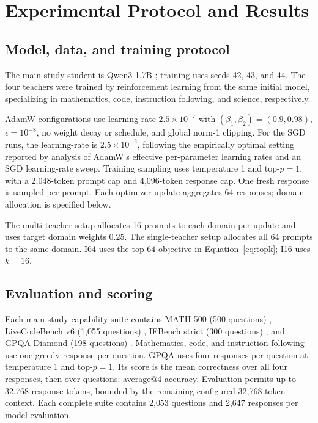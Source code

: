 \section{Experimental Protocol and Results}
\label{app:setup}

\subsection{Model, data, and training protocol}

The main-study student is Qwen3-1.7B \citep{qwen2025qwen3}; training uses seeds 42, 43, and 44. The four teachers were trained by reinforcement learning from the same initial model, specializing in mathematics, code, instruction following, and science, respectively.

AdamW configurations use learning rate $2.5\times10^{-7}$ with $(\beta_1,\beta_2)=(0.9,0.98)$, $\epsilon=10^{-8}$, no weight decay or schedule, and global norm-1 clipping. For the SGD runs, the learning-rate is $2.5\times10^{-2}$, following the empirically optimal setting reported by \citep{mukherjee2026sgd} analysis of AdamW's effective per-parameter learning rates and an SGD learning-rate sweep. Training sampling uses temperature 1 and top-$p=1$, with a 2,048-token prompt cap and 4,096-token response cap. One fresh response is sampled per prompt. Each optimizer update aggregates 64 responses; domain allocation is specified below.

The multi-teacher setup allocates 16 prompts to each domain per update and uses target domain weights $0.25$. The single-teacher setup allocates all 64 prompts to the same domain. I64 uses the top-$64$ objective in Equation~\ref{eq:topk}; I16 uses $k=16$.

\subsection{Evaluation and scoring}

Each main-study capability suite contains MATH-500 (500 questions) \citep{hendrycks2021math}, LiveCodeBench v6 (1,055 questions) \citep{jain2024livecodebench}, IFBench strict (300 questions) \citep{pyatkin2025ifbench}, and GPQA Diamond (198 questions) \citep{rein2023gpqa}. Mathematics, code, and instruction following use one greedy response per question. GPQA uses four responses per question at temperature 1 and top-$p=1$. Its score is the mean correctness over all four responses, then over questions: average@4 accuracy. Evaluation permits up to 32,768 response tokens, bounded by the remaining configured 32,768-token context. Each complete suite contains 2,053 questions and 2,647 responses per model evaluation.

